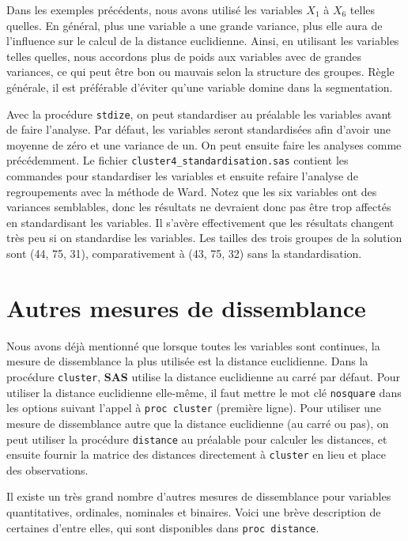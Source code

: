 \documentclass[
  11pt,
  letterpaper,
]{book}
\theoremstyle{definition}
\theoremstyle{definition}
\theoremstyle{definition}
\theoremstyle{definition}
\theoremstyle{remark}
\begin{document}
Dans les exemples précédents, nous avons utilisé les variables \(X_1\) à \(X_6\) telles quelles. En général, plus une variable a une grande variance, plus elle aura de l'influence sur le calcul de la distance euclidienne. Ainsi, en utilisant les variables telles quelles, nous accordons plus de poids aux variables avec de grandes variances, ce qui peut être bon ou mauvais selon la structure des groupes. Règle générale, il est préférable d'éviter qu'une variable domine dans la segmentation.

Avec la procédure \texttt{stdize}, on peut standardiser au préalable les variables avant de faire l'analyse. Par défaut, les variables seront standardisées afin d'avoir une moyenne de zéro et une variance de un. On peut ensuite faire les analyses comme précédemment. Le fichier \texttt{cluster4\_standardisation.sas} contient les commandes pour standardiser les variables et ensuite refaire l'analyse de regroupements avec la méthode de Ward. Notez que les six variables ont des variances semblables, donc les résultats ne devraient donc pas être trop affectés en standardisant les variables. Il s'avère effectivement que les résultats changent très peu si on standardise les variables. Les tailles des trois groupes de la solution sont (44, 75, 31), comparativement à (43, 75, 32) sans la standardisation.

\hypertarget{autres-mesures-de-dissemblance}{%
\section{Autres mesures de dissemblance}\label{autres-mesures-de-dissemblance}}

Nous avons déjà mentionné que lorsque toutes les variables sont continues, la mesure de dissemblance la plus utilisée est la distance euclidienne. Dans la procédure \texttt{cluster}, \textbf{SAS} utilise la distance euclidienne au carré par défaut. Pour utiliser la distance euclidienne elle-même, il faut mettre le mot clé \texttt{nosquare} dans les options suivant l'appel à \texttt{proc\ cluster} (première ligne). Pour utiliser une mesure de dissemblance autre que la distance euclidienne (au carré ou pas), on peut utiliser la procédure \texttt{distance} au préalable pour calculer les distances, et ensuite fournir la matrice des distances directement à \texttt{cluster} en lieu et place des observations.

Il existe un très grand nombre d'autres mesures de dissemblance pour variables quantitatives, ordinales, nominales et binaires. Voici une brève description de certaines d'entre elles, qui sont disponibles dans \texttt{proc\ distance}.
\end{document}
